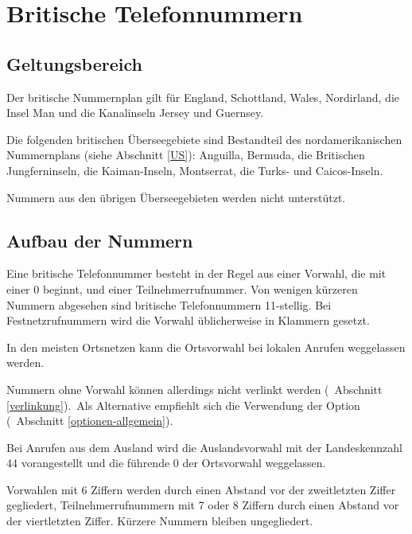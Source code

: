 \documentclass[numbers=noenddot]{scrreprt}
\newcommand\Abschnittsliteratur[1]{\bgroup
\small
\raggedright
\printbibliography[heading=subbibnumbered,keyword=#1]
\egroup}
\newcommand\UeberschriftGeltungsbereich{\section{Geltungsbereich}}
\newcommand\UeberschriftAufbau{\section{Aufbau der Nummern}}
\newcommand\KeineVerlinkung{Nummern ohne Vorwahl können allerdings nicht verlinkt werden
\vglAbschnitt{verlinkung}.}
\newcommand*\vglAbschnitt[1]{(\cf\ Abschnitt \ref{#1})}
\newcommand*\sieheAbschnitt[1]{(siehe Abschnitt \ref{#1})}
\newcommand*\AufbauDEATD[1]{Bei Anrufen aus dem Ausland wird die Auslandsvorwahl mit der Landeskennzahl #1 vorangestellt und die führende 0 der Ortsvorwahl weggelassen.}
\begin{document}
\Abschnittsliteratur{french}

\chapter{Britische Telefonnummern}
\nocite{wikipedia-UK}
\nocite{wikipedia-conventions}
\nocite{UK-formatting}
\edef\myindent{\the\parindent}
\begin{minipage}{12cm}\setlength{\parindent}{\myindent}
\UeberschriftGeltungsbereich
Der britische Nummernplan
\cite{Ofcom-plan}
gilt für England, Schottland, Wales, Nordirland, die Insel Man und die Kanalinseln Jersey und Guernsey.

Die folgenden britischen Überseegebiete sind Bestandteil des nordamerikanischen Nummernplans
\sieheAbschnitt{US}: Anguilla, Bermuda, die Britischen Jungferninseln, die Kaiman-Inseln, Montserrat, die Turks- und Caicos-Inseln.

Nummern aus den übrigen Überseegebieten werden nicht unterstützt.
\end{minipage}
\hfill
{}

\UeberschriftAufbau
Eine britische Telefonnummer besteht in der Regel aus einer Vorwahl, die mit einer 0 beginnt, und einer Teilnehmerrufnummer. Von wenigen kürzeren Nummern abgesehen sind britische Telefonnummern 11-stellig. Bei Festnetzrufnummern wird die Vorwahl üblicherweise in Klammern gesetzt.
\begin{sidebyside}
\end{sidebyside}

In den meisten Ortsnetzen kann die Ortsvorwahl bei lokalen Anrufen weggelassen werden.
\begin{sidebyside}
\end{sidebyside}
\KeineVerlinkung\ Als Alternative empfiehlt sich die Verwendung der Option 
\vglAbschnitt{optionen-allgemein}.

\AufbauDEATD{44}
\begin{sidebyside}
\end{sidebyside}

Vorwahlen mit 6 Ziffern werden durch einen Abstand vor der zweitletzten Ziffer gegliedert, Teilnehmerrufnummern mit 7 oder 8 Ziffern durch einen Abstand vor der viertletzten Ziffer. Kürzere Nummern bleiben ungegliedert.
\begin{sidebyside}
   \\
   \\
\end{sidebyside}
\end{document}
